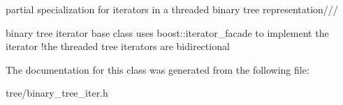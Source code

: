 partial specialization for iterators in a threaded binary tree representation///

binary tree iterator base class uses boost\-::iterator\-\_\-facade to implement the iterator !the threaded tree iterators are bidirectional 

\-The documentation for this class was generated from the following file\-:\begin{DoxyCompactItemize}
\item 
tree/binary\-\_\-tree\-\_\-iter.\-h\end{DoxyCompactItemize}
